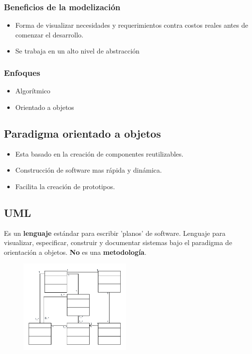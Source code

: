 \documentclass[titlepage,a4paper]{article}
\begin{document}
\subsubsection{Beneficios de la modelización}
\begin{itemize}
    \item Forma de visualizar necesidades y requerimientos contra costos reales antes de comenzar el desarrollo.
    \item Se trabaja en un alto nivel de abstracción
\end{itemize}


\subsubsection*{Enfoques}
\begin{itemize}
    \item Algorítmico
    \item Orientado a objetos
\end{itemize}

\subsection{Paradigma orientado a objetos}
\begin{itemize}
    \item Esta basado en la creación de componentes reutilizables.
    \item Construcción de software mas rápida y dinámica.
    \item Facilita la creación de prototipos.
\end{itemize}

\subsection{UML}
Es un \textbf{lenguaje} estándar para escribir 'planos' de software. Lenguaje para visualizar, especificar, construir y documentar sistemas bajo el paradigma de orientación a objetos.
\textbf{No} es una \textbf{metodología}.

\begin{figure}[!htb]
    \centering
    \includegraphics[width=0.5\textwidth]{Imagenes/UML.png}
\end{figure}
\end{document}
